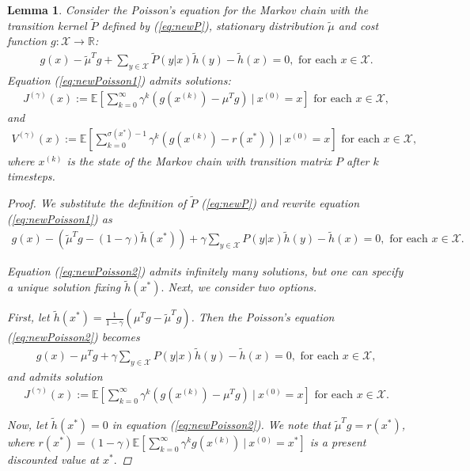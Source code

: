 \documentclass[11pt]{article}
\newcommand{\R}{\mathbb{R}}
\newcommand{\E}{\mathbb{E}}
\newcommand{\X}{\mathcal{X}}
\newtheorem{lemma}{Lemma}
\theoremstyle{definition}
\numberwithin{equation}{section}
\begin{document}
\begin{lemma}\label{lem:2sol}
Consider the Poisson's equation for the Markov chain with the transition kernel $\tilde P$ defined by (\ref{eq:newP}), stationary distribution $\tilde \mu$ and cost function $g:\X\rightarrow \R$:
\begin{align}\label{eq:newPoisson1}
g(x) - \tilde \mu^T g +\sum\limits_{y\in \X} \tilde P(y|x) \tilde h(y) - \tilde h(x) = 0, \text{ for each }x\in \X.
\end{align}
Equation (\ref{eq:newPoisson1}) admits solutions:
\begin{align*}
J^{(\gamma)}(x):=\E\left[ \sum\limits_{k=0}^{\infty} \gamma^k\left(g(x^{(k)})- \mu^Tg \right)~|~x^{(0)}=x \right] \text{ for each }x\in \X,
\end{align*}
and
\begin{align*}
V^{(\gamma )}(x):=\E\left[ \sum\limits_{k=0}^{\sigma(x^*)-1} \gamma^k\left(g (x^{(k)} )-r(x^*)\right )~|~x^{(0)}=x \right] \text{ for each }x\in \X,
\end{align*}
where   $x^{(k)}$ is the state of the Markov chain with transition matrix $P$   after $k$ timesteps.
\begin{proof}
We substitute the definition of $\tilde P$ (\ref{eq:newP}) and rewrite equation (\ref{eq:newPoisson1}) as
 \begin{align}\label{eq:newPoisson2}
g(x) - (\tilde \mu^T g - (1-\gamma) \tilde h(x^*)) + \gamma \sum\limits_{y\in \X} P(y|x) \tilde h(y)  - \tilde h(x) = 0, \text{ for each }x\in \X.
\end{align}

Equation (\ref{eq:newPoisson2}) admits infinitely many solutions, but one can specify a unique solution fixing $\tilde h(x^*).$
Next, we consider two options.

First, let $ \tilde h(x^*) = \frac{1}{1-\gamma}(\mu^Tg -\tilde \mu^T g )$. Then the Poisson's equation (\ref{eq:newPoisson2}) becomes
 \begin{align*}
g(x) - \mu^T g + \gamma \sum\limits_{y\in \X} P(y|x) \tilde h(y)  - \tilde h(x) = 0, \text{ for each }x\in \X,
\end{align*}
and admits   solution
\begin{align*}
J^{(\gamma)}(x):=\E\left[ \sum\limits_{k=0}^{\infty} \gamma^k\left(g (x^{(k)} )- \mu^Tg \right)~|~x^{(0)}=x \right] \text{ for each }x\in \X.
\end{align*}

Now, let $\tilde h(x^*) = 0$ in equation (\ref{eq:newPoisson2}). We note that $\tilde \mu^T g = r(x^*)$, where $r(x^*) = (1-\gamma)\E\left[\sum\limits_{k=0}^\infty \gamma^k g\left(x^{(k)}\right)~|~x^{(0)}=x^*\right]$ is a present discounted value at $x^*.$


\end{proof}
\end{lemma}
\end{document}
